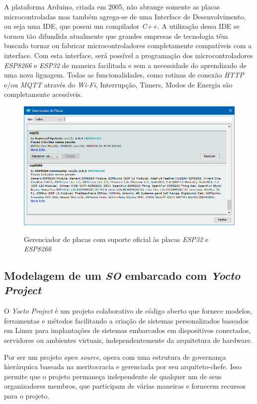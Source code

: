 A plataforma Arduino, criada em 2005, não abrange somente as placas microcontroladas mas também agrega-se de uma Interface de Desenvolvimento, ou seja uma IDE, que possui um compilador \textit{C++}. A utilização dessa IDE se tornou tão difundida atualmente que grandes empresas de tecnologia têm buscado tornar ou fabricar microcontroladores completamente compatíveis com a interface.  
Com esta interface, será possível a programação dos microcontroladores \textit{ESP8266} e \textit{ESP32} de maneira facilitada e sem a necessidade do aprendizado de uma nova liguagem. Todas as funcionalidades, como rotinas de conexão \textit{HTTP} e/ou \textit{MQTT} através do \textit{Wi-Fi}, Interrupção, Timers, Modos de Energia são completamente acessíveis. 

\begin{figure}[H]
	\centering
	\caption{Gerenciador de placas com suporte oficial às placas \textit{ESP32} e \textit{ESP8266}}
	\includegraphics[width=1.0\textwidth]{figuras/gerenciador_placas_arduino.png}
	\label{fig:youcto-fluxo}
\end{figure} 

\subsection{Modelagem de um \textit{SO} embarcado com \textit{Yocto Project}}

O \textit{Yocto Project} é um projeto colaborativo de código aberto que fornece modelos, ferramentas e métodos facilitando a criação de sistemas personalizados baseados em Linux para implantações de sistemas embarcados em dispositivos conectados, servidores ou ambientes virtuais, independentemente da arquitetura de hardware.

Por ser um projeto \textit{open source}, opera com uma estrutura de governança hierárquica baseada na meritocracia e gerenciada por seu arquiteto-chefe. Isso permite que o projeto permaneça independente de qualquer um de seus organizadores membros, que participam de várias maneiras e fornecem recursos para o projeto.

